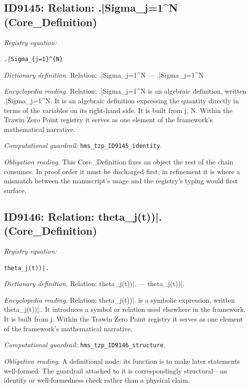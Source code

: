 \documentclass[11pt]{article}
\theoremstyle{remark}
\begin{document}
\subsection{ID9145: Relation: .|Sigma\_j=1\textasciicircum{}N (Core\_Definition)}

\noindent\textit{Registry equation:}\par
{\small\texttt{.|Sigma\_\{j=1\}\textasciicircum{}\{N\}}}\par\medskip
\noindent\textit{Dictionary definition.} Relation: .|Sigma\_j=1\textasciicircum{}N --- .|Sigma\_j=1\textasciicircum{}N\par\medskip
\noindent\textit{Encyclopedia reading.} Relation: .|Sigma\_j=1\textasciicircum{}N is an algebraic definition, written .|Sigma\_j=1\textasciicircum{}N. It is an algebraic definition expressing the quantity directly in terms of the variables on its right-hand side. It is built from j, N. Within the Trawin Zero Point registry it serves as one element of the framework's mathematical narrative.
\par\medskip\noindent\textit{Computational guardrail:} \texttt{hms\_tzp\_ID9145\_identity}.
\par\medskip\noindent\textit{Obligation reading.} This Core\_Definition fixes an object the rest of the chain consumes. In proof order it must be discharged first; in refinement it is where a mismatch between the manuscript's usage and the registry's typing would first surface.

\subsection{ID9146: Relation: theta\_j(t))|. (Core\_Definition)}

\noindent\textit{Registry equation:}\par
{\small\texttt{theta\_j(t))|.}}\par\medskip
\noindent\textit{Dictionary definition.} Relation: theta\_j(t))|. --- theta\_j(t))|.\par\medskip
\noindent\textit{Encyclopedia reading.} Relation: theta\_j(t))|. is a symbolic expression, written theta\_j(t))|.. It introduces a symbol or relation used elsewhere in the framework. It is built from j. Within the Trawin Zero Point registry it serves as one element of the framework's mathematical narrative.
\par\medskip\noindent\textit{Computational guardrail:} \texttt{hms\_tzp\_ID9146\_structure}.
\par\medskip\noindent\textit{Obligation reading.} A definitional node: its function is to make later statements well-formed. The guardrail attached to it is correspondingly structural---an identity or well-formedness check rather than a physical claim.
\end{document}
